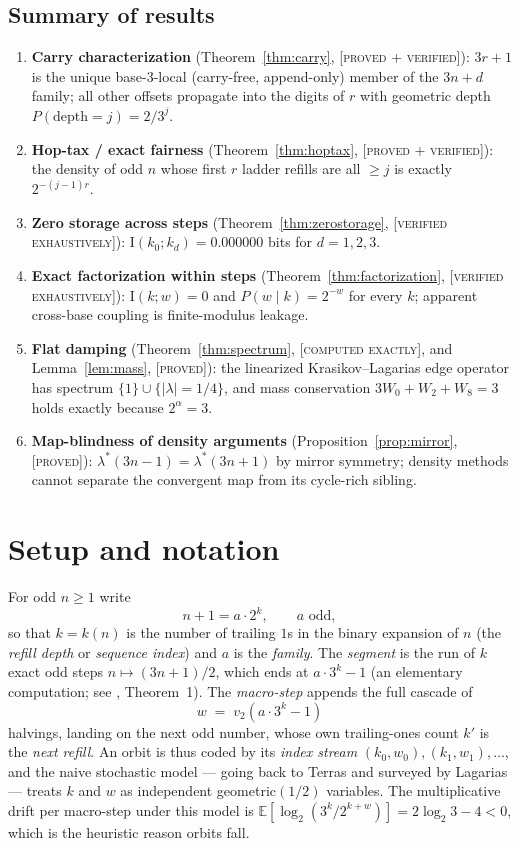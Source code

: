 \documentclass[11pt]{article}
\theoremstyle{definition}
\newcommand{\PROVED}{\textup{[\textsc{proved}]}}
\newcommand{\PROVEDVER}{\textup{[\textsc{proved + verified}]}}
\newcommand{\VERIFIED}{\textup{[\textsc{verified exhaustively}]}}
\newcommand{\COMPUTED}{\textup{[\textsc{computed exactly}]}}
\newcommand{\vtwo}{v_2}
\newcommand{\Info}{\mathrm{I}}
\begin{document}
\subsection*{Summary of results}

\begin{enumerate}[label=(\roman*)]
\item \textbf{Carry characterization} (Theorem~\ref{thm:carry}, \PROVEDVER):
$3r+1$ is the unique base-$3$-local (carry-free, append-only) member of the $3n+d$
family; all other offsets propagate into the digits of $r$ with geometric depth
$P(\mathrm{depth}=j) = 2/3^j$.
\item \textbf{Hop-tax / exact fairness} (Theorem~\ref{thm:hoptax}, \PROVEDVER): the
density of odd $n$ whose first $r$ ladder refills are all $\geq j$ is exactly
$2^{-(j-1)r}$.
\item \textbf{Zero storage across steps} (Theorem~\ref{thm:zerostorage}, \VERIFIED):
$\Info(k_0; k_d) = 0.000000$ bits for $d = 1,2,3$.
\item \textbf{Exact factorization within steps} (Theorem~\ref{thm:factorization},
\VERIFIED): $\Info(k;w) = 0$ and $P(w \mid k) = 2^{-w}$ for every $k$; apparent
cross-base coupling is finite-modulus leakage.
\item \textbf{Flat damping} (Theorem~\ref{thm:spectrum}, \COMPUTED{}, and
Lemma~\ref{lem:mass}, \PROVED): the linearized Krasikov--Lagarias edge operator has
spectrum $\{1\} \cup \{|\lambda| = 1/4\}$, and mass conservation
$3W_0 + W_2 + W_8 = 3$ holds exactly because $2^\alpha = 3$.
\item \textbf{Map-blindness of density arguments} (Proposition~\ref{prop:mirror},
\PROVED): $\lambda^*(3n-1) = \lambda^*(3n+1)$ by mirror symmetry; density methods
cannot separate the convergent map from its cycle-rich sibling.
\end{enumerate}

\section{Setup and notation}

For odd $n \geq 1$ write
\[
n + 1 = a \cdot 2^k, \qquad a \text{ odd},
\]
so that $k = k(n)$ is the number of trailing $1$s in the binary expansion of $n$
(the \emph{refill depth} or \emph{sequence index}) and $a$ is the \emph{family}. The
\emph{segment} is the run of $k$ exact odd steps $n \mapsto (3n+1)/2$, which ends at
$a \cdot 3^k - 1$ (an elementary computation; see \cite{Note2026}, Theorem~1). The
\emph{macro-step} appends the full cascade of
\[
w \;=\; \vtwo\!\left(a \cdot 3^k - 1\right)
\]
halvings, landing on the next odd number, whose own trailing-ones count $k'$ is the
\emph{next refill}. An orbit is thus coded by its \emph{index stream}
$(k_0, w_0), (k_1, w_1), \dots$, and the naive stochastic model --- going back to
Terras \cite{Terras1976} and surveyed by Lagarias \cite{Lagarias1985, Lagarias2010} ---
treats $k$ and $w$ as independent geometric$(1/2)$ variables. The multiplicative drift
per macro-step under this model is
$\mathbb{E}[\log_2(3^k/2^{k+w})] = 2\log_2 3 - 4 < 0$, which is the heuristic reason
orbits fall.
\end{document}
